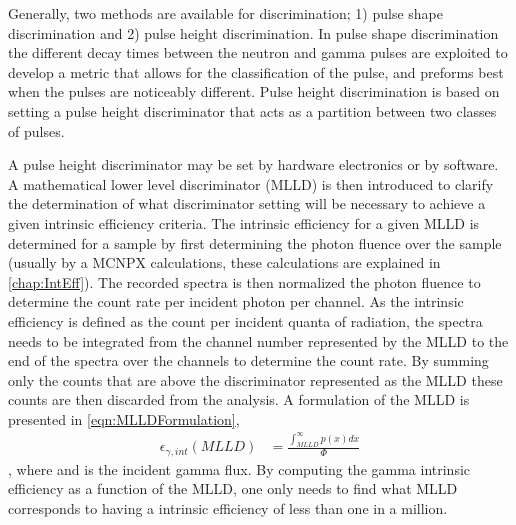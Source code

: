 Generally, two methods are available for discrimination; 1) pulse shape discrimination and 2) pulse height discrimination.
In pulse shape discrimination the different decay times between the neutron and gamma pulses are exploited to develop a metric that allows for the classification of the pulse, and preforms best when the pulses are noticeably different.
Pulse height discrimination is based on setting a pulse height discriminator that acts as a partition between two classes of pulses.

A pulse height discriminator may be set by hardware electronics or by software.
A mathematical lower level discriminator (MLLD) is then introduced to clarify the determination of what discriminator setting will be necessary to achieve a given intrinsic efficiency criteria.
The intrinsic efficiency for a given MLLD is determined for a sample by first determining the photon fluence over the sample (usually by a MCNPX calculations, these calculations are explained in \autoref{chap:IntEff}).
The recorded spectra is then normalized the photon fluence to determine the count rate per incident photon per channel.
As the intrinsic efficiency is defined as the count per incident quanta of radiation, the spectra needs to be integrated from the channel number represented by the MLLD to the end of the spectra over the channels to determine the count rate.
By summing only the counts that are above the discriminator represented as the MLLD these counts are then discarded from the analysis.
A formulation of the MLLD is presented in \eqref{eqn:MLLDFormulation},
\begin{align}
	\epsilon_{\gamma,int}\left(MLLD\right) &= \frac{\int_{MLLD}^{\infty}p(x)dx}{\Phi}
  \label{eqn:MLLDFormulation}
\end{align},
where  and  is the incident gamma flux.
By computing the gamma intrinsic efficiency as a function of the MLLD, one only needs to find what MLLD corresponds to having a intrinsic efficiency of less than one in a million.

